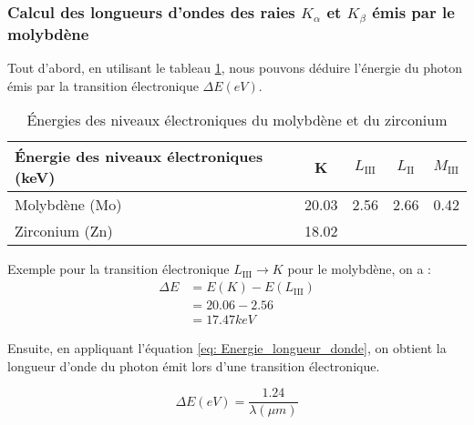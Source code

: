 






\subsubsection{Calcul des longueurs d'ondes des raies $K_{\alpha}$ et $K_{\beta}$ émis par le molybdène}


Tout d'abord, en utilisant le tableau \ref{tab: Tableau des nergies de niveaux lectroniques du Molybdne et du Zirconium}, nous pouvons déduire l'énergie du photon émis par la transition électronique $\Delta E(eV)$. 

\begin{table}[h!]
	\centering
	\begin{tabular}{|l|c|c|c|c|}
		\hline
		\textbf{Énergie des niveaux électroniques (keV)} & K     & $L_{\mathrm{III}}$ &$L_{\mathrm{II}}$ & $M_{\mathrm{III}}$ \\ \hline
		Molybdène      (Mo)                                  & 20.03 & 2.56 & 2.66 & 0.42 \\ \hline
		Zirconium      (Zn)                                  & 18.02 &      &      &      \\ \hline
	\end{tabular}
	\caption{Énergies des niveaux électroniques du molybdène et du zirconium}
	\label{tab: Tableau des nergies de niveaux lectroniques du Molybdne et du Zirconium}
\end{table}


Exemple pour la transition électronique $L_{\mathrm{III}} \to K$ pour le molybdène, on a : 
\vspace{0.2cm}
\begin{equation*}	
	\begin{split}
		\Delta E  & = E(K) - E(L_{\mathrm{III}})  \\
		& = 20.06 - 2.56  \\
		& = 17.47keV
	\end{split}	
\end{equation*}

Ensuite, en appliquant l'équation \ref{eq: Energie_longueur_donde}, on obtient la longueur d'onde du photon émit lors d'une transition électronique.

\begin{equation}\label{eq: Energie_longueur_donde}
	\Delta E(eV) = \frac{1.24}{\lambda (\mu m)}
\end{equation}

